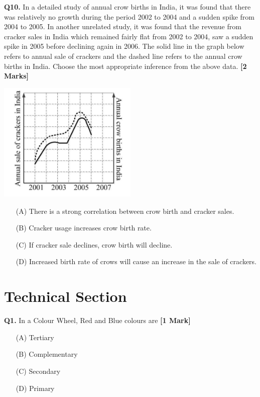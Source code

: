 \documentclass[11pt]{article}
\newcommand{\questiona}[2]{
    \noindent\textbf{Q#2.} #1 \hfill \textbf{[1 Mark]}
}
\newcommand{\questionb}[2]{
    \noindent\textbf{Q#2.} #1 \hfill \textbf{[2 Marks]}
}
\begin{document}
\questionb{In a detailed study of annual crow births in India, it was found that there was relatively no growth during the period 2002 to 2004 and a sudden spike from 2004 to 2005. In another unrelated study, it was found that the revenue from cracker sales in India which remained fairly flat from 2002 to 2004, saw a sudden spike in 2005 before declining again in 2006. The solid line in the graph below refers to annual sale of crackers and the dashed line refers to the annual crow births in India. Choose the most appropriate inference from the above data.}{10}
\begin{center}
\includegraphics[width=0.5\textwidth]{figures/10.png}
\end{center}
\begin{enumerate}
    \item[(A)] There is a strong correlation between crow birth and cracker sales.  
    \item[(B)] Cracker usage increases crow birth rate.  
    \item[(C)] If cracker sale declines, crow birth will decline.  
    \item[(D)] Increased birth rate of crows will cause an increase in the sale of crackers.  
\end{enumerate}
\vspace{0.5cm}

\section*{Technical Section}

\questiona{In a Colour Wheel, Red and Blue colours are}{1}
\begin{enumerate}
    \item[(A)] Tertiary  
    \item[(B)] Complementary  
    \item[(C)] Secondary  
    \item[(D)] Primary  
\end{enumerate}
\vspace{0.5cm}
\end{document}
